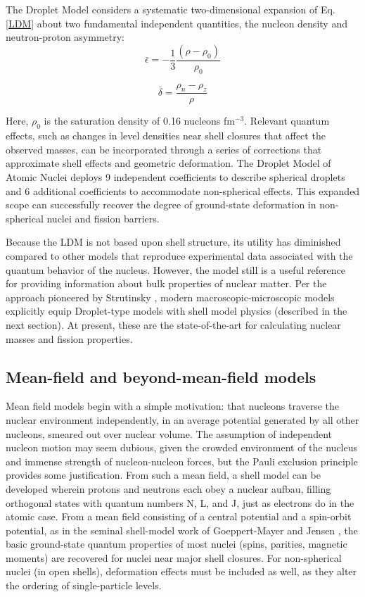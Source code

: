 The Droplet Model \cite{MyersAndSwiatecki} considers a systematic two-dimensional expansion of
Eq. \ref{LDM} about two fundamental independent quantities, the nucleon density
and neutron-proton asymmetry:
\begin{equation} \label{DropletIndependentQuantities}
    \bar{\epsilon} = -\frac{1}{3}\frac{(\rho - \rho_{0})}{\rho_{0}}
\end{equation}

\begin{equation}
    \bar{\delta} = \frac{\rho_{n}-\rho_{z}}{\rho}
\end{equation}

\noindent
Here, $\rho_{0}$ is the saturation density of 0.16 nucleons fm$^{-3}$. Relevant quantum
effects, such as changes in level densities near shell closures
that affect the observed masses, can be incorporated through a series of corrections
that approximate shell effects and geometric deformation.
The Droplet Model of Atomic Nuclei deploys 9 
independent coefficients to describe spherical droplets and 6 additional
coefficients to accommodate non-spherical effects. This expanded scope
can successfully recover the degree of ground-state deformation in non-spherical
nuclei and fission barriers.

Because the LDM is not based upon shell structure, its utility has diminished
compared to other models that reproduce experimental data associated with the quantum
behavior of the nucleus. However, the model still is a useful reference for providing 
information about bulk properties of nuclear matter. Per the approach pioneered by Strutinsky \cite{Strutinsky1967, Seeger1975},
modern macroscopic-microscopic models \cite{Moller1988, Wang2015} explicitly equip Droplet-type models
with shell model physics (described in the next section). At present, these are the state-of-the-art
for calculating nuclear masses and fission properties.

\subsection{Mean-field and beyond-mean-field models}
Mean field models begin with a simple motivation: that nucleons
traverse the nuclear environment independently, in an average
potential generated by all other nucleons, smeared out over nuclear volume.
The assumption of independent nucleon motion may seem dubious, given the
crowded environment of the nucleus and immense strength of nucleon-nucleon forces,
but the Pauli exclusion principle provides some justification.
From such a mean field, a shell model can be developed wherein protons and neutrons each
obey a nuclear aufbau, filling orthogonal states with quantum numbers N, L, and J, just as electrons do in the atomic 
case. From a mean field consisting of a central
potential and a spin-orbit potential, as in the seminal shell-model work of Goeppert-Mayer
and Jensen \cite{GoeppertMayer1955}, the basic ground-state quantum properties of most nuclei
(spins, parities, magnetic moments) are recovered for nuclei near major shell closures. For non-spherical nuclei (in open shells),
deformation effects must be included as well, as they alter the ordering of single-particle levels.

